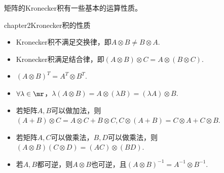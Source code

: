 矩阵的Kronecker积有一些基本的运算性质。
\begin{mythm}{}{chapter2Kronecker积的性质}
	\begin{itemize}
		\item[(1)] Kronecker积不满足交换律，即$A\otimes B\neq B\otimes A$.
		\item[(2)] Kronecker积满足结合律，即$(A\otimes B)\otimes C=A\otimes (B\otimes C)$.
		\item[(3)] $(A\otimes B)^{T}=A^{T}\otimes B^{T}$.
		\item[(4)] $\forall\lambda\in \mr$，$\lambda(A\otimes B)=A\otimes (\lambda B)=(\lambda A)\otimes B$.
		\item[(5)] 若矩阵$A,B$可以做加法，则$(A+B)\otimes C=A\otimes C+B\otimes C,C\otimes (A+B)=C\otimes A+C\otimes B$.
		\item[(6)] 若矩阵$A,C$可以做乘法，$B,D$可以做乘法，则$(A\otimes B) (C\otimes D)=(AC)\otimes(BD)$.
		\item[(7)] 若$A,B$都可逆，则$A\otimes B$也可逆，且$(A\otimes B)^{-1}=A^{-1}\otimes B^{-1}$.
	\end{itemize}
\end{mythm}

